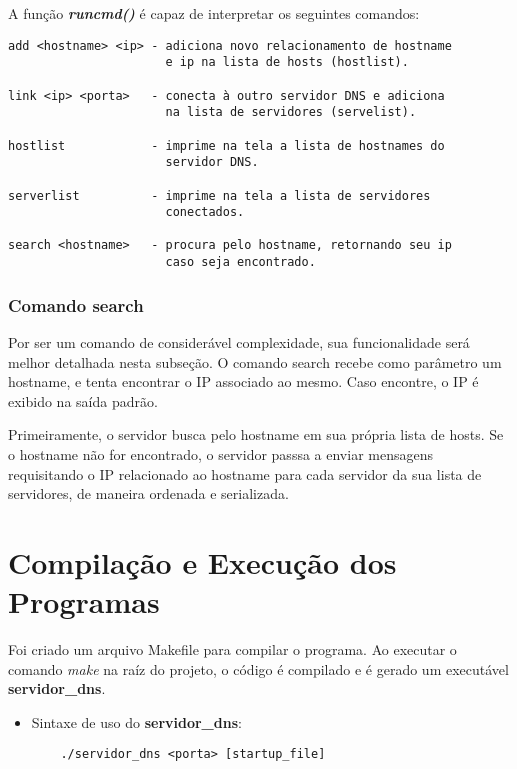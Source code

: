 \documentclass[12pt]{article}
\begin{document}
\vspace{1em}
\noindent
A função \emph{\textbf{runcmd()}} é capaz de interpretar os seguintes comandos: \par


\begin{verbatim}
add <hostname> <ip> - adiciona novo relacionamento de hostname 
                      e ip na lista de hosts (hostlist).

link <ip> <porta>   - conecta à outro servidor DNS e adiciona 
                      na lista de servidores (servelist).
                    
hostlist            - imprime na tela a lista de hostnames do
                      servidor DNS.

serverlist          - imprime na tela a lista de servidores
                      conectados.

search <hostname>   - procura pelo hostname, retornando seu ip
                      caso seja encontrado.
\end{verbatim}

\subsubsection{Comando search}
Por ser um comando de considerável complexidade, sua funcionalidade será melhor detalhada nesta subseção.
O comando search recebe como parâmetro um hostname, e tenta encontrar o IP associado ao mesmo. Caso encontre, o IP é exibido na saída padrão. \par
\noindent Primeiramente, o servidor busca pelo hostname em sua própria lista de hosts. 
Se o hostname não for encontrado, o servidor passsa a enviar mensagens requisitando o IP relacionado ao hostname para cada servidor da sua lista de servidores, de maneira ordenada e serializada.

\section{Compilação e Execução dos Programas}

Foi criado um arquivo Makefile para compilar o programa. Ao executar o comando \emph{make} na raíz do projeto, o código é compilado e é gerado um executável \textbf{servidor\_dns}. \par

\begin{itemize}
    \item Sintaxe de uso do \textbf{servidor\_dns}:
    \begin{verbatim}
    ./servidor_dns <porta> [startup_file]
    \end{verbatim}
\end{itemize}
\end{document}
